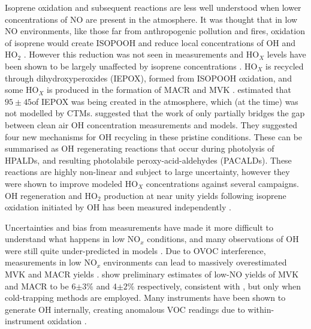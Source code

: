       Isoprene oxidation and subsequent reactions are less well understood when lower concentrations of NO are present in the atmosphere.
      It was thought that in low NO environments, like those far from anthropogenic pollution and fires, oxidation of isoprene would create ISOPOOH and reduce local concentrations of OH and HO$_2$ \parencite{Guenther2000,Paulot2009b}.
      However this reduction was not seen in measurements and HO$_X$ levels have been shown to be largely unaffected by isoprene concentrations \parencite{Paulot2009b}.
      HO$_X$ is recycled through dihydroxyperoxides (IEPOX), formed from ISOPOOH oxidation, and some HO$_X$ is produced in the formation of MACR and MVK \parencite{Paulot2009b}.
      \textcite{Paulot2009b} estimated that $95 \pm 45$\tgpyr of IEPOX was being created in the atmosphere, which (at the time) was not modelled by CTMs.
      \textcite{Peeters2010} suggested that the work of \textcite{Paulot2009b} only partially bridges the gap between clean air OH concentration measurements and models.
      They suggested four new mechanisms for OH recycling in these pristine conditions.
      These can be summarised as OH regenerating reactions that occur during photolysis of HPALDs, and resulting photolabile peroxy-acid-aldehydes (PACALDs).
      These reactions are highly non-linear and subject to large uncertainty, however they were shown to improve modeled HO$_X$ concentrations against several campaigns.
      OH regeneration and HO$_2$ production at near unity yields following isoprene oxidation initiated by OH has been measured independently \parencite{Peeters2010, Crounse2012}.
      
      
      Uncertainties and bias from measurements have made it more difficult to understand what happens in low NO$_x$ conditions, and many observations of OH were still quite under-predicted in models \parencite{Mao2012}.
      Due to OVOC interference, measurements in low NO$_x$ environments can lead to massively overestimated MVK and MACR yields \parencite{Nguyen2014}.
      \textcite{Nguyen2014} show preliminary estimates of low-NO yields of MVK and MACR to be 6$\pm3\%$ and 4$\pm2\%$ respectively, consistent with \textcite{Liu2013}, but only when cold-trapping methods are employed.
      Many instruments have been shown to generate OH internally, creating anomalous VOC readings due to within-instrument oxidation \parencite{Mao2012}.
      
